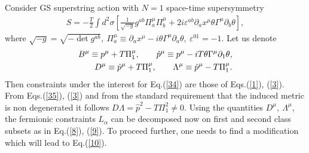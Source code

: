 \documentclass[a4paper]{article}
\begin{document}
Consider GS superstring action with $N=1$ space-time supersymmetry
\begin{eqnarray}\label{34}
S=-\frac{T}{2}\int d^2\sigma
\left[\frac{1}{\sqrt{-g}}g^{ab}
\Pi_a^\mu \Pi_b^\mu+2i\varepsilon^{ab}\partial_ax^\mu
\theta\Gamma^\mu\partial_b\theta\right],
\end{eqnarray}
where $\sqrt{-g}=\sqrt{-\det{g^{ab}}}, ~ \Pi^\mu_a\equiv
\partial_ax^\mu-i\theta\Gamma^\mu\partial_a\theta, ~
\varepsilon^{01}=-1$. Let us denote
\begin{eqnarray}\label{35}
B^\mu\equiv p^\mu+T\Pi_1^\mu, \qquad
\hat p^\mu\equiv p^\mu-iT\theta\Gamma^\mu\partial_1\theta, \cr
D^\mu\equiv\hat p^\mu+T\Pi_1^\mu, \qquad
\Lambda^\mu\equiv\hat p^\mu-T\Pi_1^\mu.
\end{eqnarray}
Then constraints under the interest for Eq.(\ref{34}) are those of 
Eqs.(\ref{1}), (\ref{3}).
From Eqs.(\ref{35}), (\ref{3}) and from the standard requirement that
the induced metric is non degenerated it follows 
$D\Lambda=\hat p^2-T\Pi_1^2\ne 0$. 
Using the quantities $D^\mu, ~ \Lambda^\mu$, the fermionic 
constraints $L_\alpha$ can be decomposed now on first and second class 
subsets as in Eq.(\ref{8}), (\ref{9}). To proceed further, one needs to 
find a modification which will lead to Eq.(\ref{10}).
\end{document}
